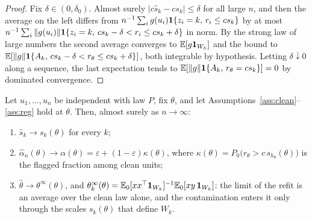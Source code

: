 \begin{proof}
Fix $\delta\in(0,\delta_0)$. Almost surely $|c\hat s_k-cs_k|\le\delta$ for all large $n$, and
then the average on the left differs from
$n^{-1}\sum_ig(u_i)\mathbf{1}\{z_i=k,\,r_i\le cs_k\}$ by at most
$n^{-1}\sum_i\|g(u_i)\|\mathbf{1}\{z_i=k,\,cs_k-\delta<r_i\le cs_k+\delta\}$ in norm. By the strong
law of large numbers the second average converges to $\mathbb{E}[g\mathbf{1}_{W_k}]$ and the bound to
$\mathbb{E}[\|g\|\mathbf{1}\{A_k,\,cs_k-\delta<r_\theta\le cs_k+\delta\}]$, both integrable by hypothesis.
Letting $\delta\downarrow0$ along a sequence, the last expectation tends to
$\mathbb{E}[\|g\|\mathbf{1}\{A_k,\,r_\theta=cs_k\}]=0$ by dominated convergence.
\end{proof}

\begin{theorem}
\label{thm:stepfixed}
Let $u_1,\dots,u_n$ be independent with law $P$, fix $\theta$, and let
Assumptions~\ref{ass:clean}--\ref{ass:reg} hold at $\theta$. Then, almost surely as
$n\to\infty$:
\begin{enumerate}[label=(\roman*),leftmargin=2.2em,itemsep=2pt]
\item $\hat s_k\to s_k(\theta)$ for every $k$;
\item $\hat\alpha_n(\theta)\to\alpha(\theta)=\varepsilon+(1-\varepsilon)\kappa(\theta)$,
where $\kappa(\theta)=P_0\bigl(r_\theta>c\,s_{h_\theta}(\theta)\bigr)$ is the flagged
fraction among clean units;
\item $\hat\theta\to\theta^{\infty}(\theta)$, and
$\theta^{\infty}_k(\theta)=\mathbb{E}_0[xx^{\top}\mathbf{1}_{W_k}]^{-1}\mathbb{E}_0[xy\,\mathbf{1}_{W_k}]$: the limit of
the refit is an average over the clean law alone, and the contamination enters it only through
the scales $s_k(\theta)$ that define $W_k$.
\end{enumerate}
\end{theorem}

